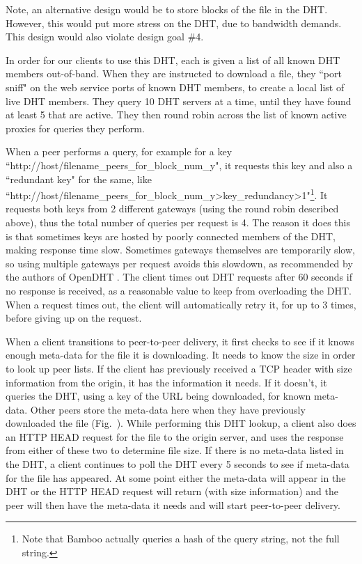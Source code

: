 Note, an alternative design would be to store blocks of the file in the DHT.  However, this
would put more stress on the DHT, due to bandwidth demands.  This design would also violate design goal \#4.

In order for our clients to use this DHT, each is given a list of all known DHT members out-of-band.  When they are instructed to download a file, 
they ``port sniff" on the web service ports of known DHT members, to create a local list of live DHT members.  
They query 10 DHT servers at a time, until they have found at least 5 that are active.
They then round robin across the list of known active proxies for queries they perform.

When a peer performs a query, for example for a key ``http://host/filename\_peers\_for\_block\_num\_y", it requests this key and also a ``redundant key" for the same, 
like ``http://host/filename\_peers\_for\_block\_num\_y\->key\_redundancy\->1"\footnote{Note that Bamboo actually queries a hash of the query string, not the full string.}.  
It requests both keys from 2 different gateways (using the round robin described above), 
thus the total number of queries per request is 4.  
The reason it does this is that sometimes keys are hosted by poorly connected members of the DHT, making response time slow.
Sometimes gateways themselves are temporarily slow, so using multiple gateways per request avoids this slowdown, as recommended by the authors of OpenDHT \cite{opendht_embarrassing}.
The client times out DHT requests after 60 seconds if no response is received, as a reasonable value to keep from 
overloading the DHT.  When a request times out, the client will automatically retry it, for up to 3 times, before giving up on the request.

When a client transitions to peer-to-peer delivery, it first checks to see if it knows enough meta-data for the file it is downloading.  
It needs to know the size in order to look up peer lists.
If the client has previously received a TCP header with size information from the origin, it has the information it needs.  If it doesn't, it
queries the DHT, using a key of the URL being downloaded, for known meta-data.  
Other peers store the meta-data here when they have previously downloaded the file (Fig.~\cite{yanc_step_1}). 
While performing this DHT lookup, a client also does an HTTP HEAD request for the file to the origin server, and uses the response from either of these two to determine file size.  
If there is no meta-data listed in the DHT, a client continues to poll the DHT every 5 seconds to see if meta-data for the file has appeared.  At some point
either the meta-data will appear in the DHT or the HTTP HEAD request will return (with size information) and the peer will then have the meta-data 
it needs and will start  peer-to-peer delivery.

